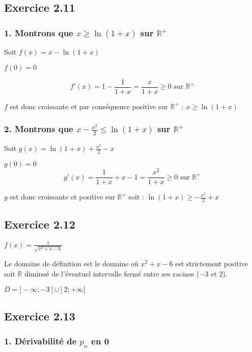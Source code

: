\documentclass[a4paper,10pt]{report}
\begin{document}
\subsection*{Exercice 2.11}
\subsubsection*{1. Montrons que $x \geq \ln(1+x)$ sur $\mathbb{R}^+$}

Soit $f(x) = x - \ln(1+x)$

$f(0) = 0$

\begin{displaymath}
	f'(x) = 1 - \frac{1}{1+x} = \frac{x}{1+x} \geq 0 \text{ sur } \mathbb{R}^{+}
\end{displaymath}

$f$ est donc croissante et par conséquence positive sur $\mathbb{R}^{+}$ : $x \geq \ln(1+x)$


\subsubsection*{2. Montrons que $x -\frac{x^2}{2} \leq \ln(1+x)$ sur $\mathbb{R}^+$}

Soit $g(x) = \ln(1+x) + \frac{x^2}{2} - x$

$g(0) = 0$
\begin{displaymath}
	g'(x) = \frac{1}{1+x} + x - 1 = \frac{x^2}{1+x} \geq 0 \text{ sur } \mathbb{R}^{+}
\end{displaymath}

$g$ est donc croissante et positive sur $\mathbb{R}^{+}$ soit : $\ln(1+x) \geq -\frac{x^2}{2} + x$

\subsection*{Exercice 2.12}

$f(x) = \frac{1}{\sqrt{x^2 +x - 6}}$

Le domaine de définition est le domaine où $x^2 + x -6$ est strictement positive soit $\mathbb{R}$ diminué de l'éventuel
intervalle fermé entre ses racines ($-3$ et $2$).

$D = ]-\infty ; -3 [ \cup ]2; +\infty[$

\subsection*{Exercice 2.13}
\subsubsection*{1. Dérivabilité de $p_\alpha$ en 0}
\end{document}
